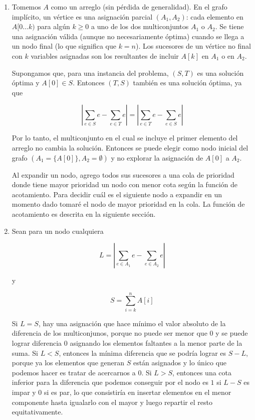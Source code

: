 \documentclass{article}
\begin{document}
\begin{enumerate}

 \item

Tomemos $A$ como un arreglo (sin pérdida de generalidad). En el grafo implícito, un vértice es
una asignación parcial $(A_1, A_2)$: cada elemento en $A[0 \ldots k)$ para algún $k \geq 0$ a uno de los dos multiconjuntos
$A_1$ o $A_2$.
Se tiene una asignación válida (aunque no necesariamente óptima) cuando se llega a un nodo final (lo que significa que $k = n$).
Los sucesores de un vértice no final con $k$ variables asignadas
son los resultantes de incluir $A[k]$ en $A_1$ o en $A_2$.

Supongamos que, para una instancia del problema, $(S, T)$ es una solución óptima
y $A[0] \in S$. Entonces $(T, S)$ también es una solución óptima, ya que

$$
\left|\sum_{e \in S} e - \sum_{e \in T} e\right| = \left|\sum_{e \in T} e - \sum_{e \in S} e\right|
$$

Por lo tanto, el multiconjunto en el cual se incluye el primer elemento del arreglo no cambia la solución.
Entonces se puede elegir como nodo inicial del grafo $(A_1 = \{A[0]\}, A_2 = \emptyset)$ y no explorar
la asignación de $A[0]$ a $A_2$.

Al expandir un nodo, agrego todos sus sucesores a una cola de prioridad donde tiene mayor prioridad un nodo
con menor cota según la función de acotamiento.
Para decidir cuál es el siguiente nodo a expandir en un momento dado tomaré el nodo de mayor prioridad
en la cola. La función de acotamiento es descrita en la siguiente sección.

 \item

Sean para un nodo cualquiera

$$
L = \left|\sum_{e \in A_1} e - \sum_{e \in A_2} e\right|
$$

y

$$
S = \sum_{i=k}^n A[i]
$$

Si $L = S$, hay una asignación que hace mínimo el valor absoluto de la diferencia de los multiconjunos, porque
no puede ser menor que $0$ y se puede lograr diferencia $0$ asignando los elementos faltantes a la menor parte
de la suma. Si $L < S$, entonces la mínima diferencia que se podría lograr es $S-L$, porque ya los elementos que
generan $S$ están asignados y lo único que podemos hacer es tratar de acercarnos a $0$. Si $L > S$, entonces
una cota inferior para la diferencia que podemos conseguir por el nodo es $1$ si $L-S$ es impar y $0$ si es par,
lo que consistiría en insertar
elementos en el menor componente hasta igualarlo con el mayor y luego repartir el resto equitativamente.


\end{enumerate}
\end{document}

